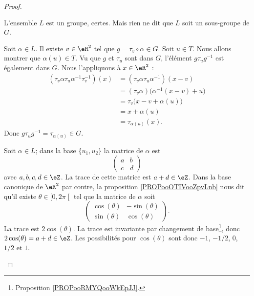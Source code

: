 \begin{proof}
\begin{subproof}
		\spitem[Précision]
		L'ensemble \( L\) est un groupe, certes. Mais rien ne dit que \( L\) soit un sous-groupe de \( G\).

		Soit \( \alpha\in L\). Il existe \( v\in \eR^2\) tel que \( g=\tau_v\circ \alpha\in G\). Soit \( u\in T\). Nous allons montrer que \( \alpha(u)\in T\). Vu que \( g\) et \( \tau_u\) sont dans \( G\), l'élément \( g\tau_ug^{-1}\) est également dans \( G\). Nous l'appliquons à \( x\in \eR^2\) :
		\begin{subequations}
			\begin{align}
				(\tau_v\alpha\tau_u\alpha^{-1}\tau_v^{-1})(x) & =(\tau_v\alpha\tau_u\alpha^{-1})(x-v)         \\
				                                              & =(\tau_v\alpha)\big( \alpha^{-1}(x-v)+u \big) \\
				                                              & =\tau_v\big( x-v+\alpha(u) \big)              \\
				                                              & =x+\alpha(u)                                  \\
				                                              & =\tau_{\alpha(u)}(x).
			\end{align}
		\end{subequations}
		Donc \( g\tau_ug^{-1}=\tau_{\alpha(u)}\in G\).

		Soit \( \alpha\in L\); dans la base \( \{ u_1,u_2 \}\) la matrice de \( \alpha\) est
		\begin{equation}
			\begin{pmatrix}
				a & b \\
				c & d
			\end{pmatrix}
		\end{equation}
		avec \( a,b,c,d\in \eZ\). La trace de cette matrice est \( a+d\in \eZ\). Dans la base canonique de \( \eR^2\) par contre, la proposition \ref{PROPooOTIVooZpvLnb} nous dit qu'il existe \( \theta\in \mathopen[ 0 , 2\pi \mathclose[\) tel que la matrice de \( \alpha\) soit
		\begin{equation}
			\begin{pmatrix}
				\cos(\theta) & -\sin(\theta) \\
				\sin(\theta) & \cos(\theta)
			\end{pmatrix}.
		\end{equation}
		La trace est \( 2\cos(\theta)\). La trace est invariante par changement de base\footnote{Proposition \ref{PROPooRMYQooWkEpJJ}.}, donc \( 2\cos(\theta)=a+d\in \eZ\). Les possibilités pour \( \cos(\theta)\) sont donc \( -1\), \( -1/2\), \( 0\), \( 1/2\) et \( 1\).


\end{subproof}
\end{proof}
